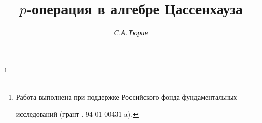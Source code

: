 

  




  


\newcommand{\Der}{\operatorname{Der}}  


\newcommand{\tts}[1]{} 


  




  


\setcounter{page}{79}  












\author{\it С.А.\,Тюрин}  




\title{$p$-операция в алгебре Цассенхауза}  


  


\thanks{Работа выполнена при поддержке Российского фонда фундаментальных 


исследований (грант \No. 94-01-00431-a).}  


\date{}  




  


\pagestyle{plain} %


  


  




